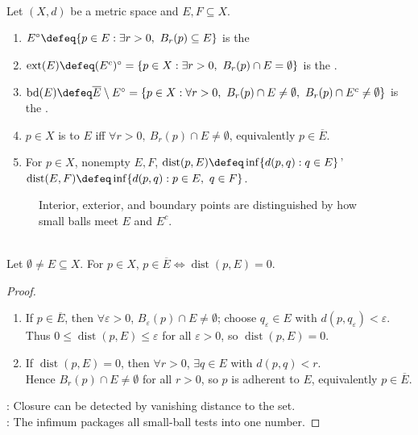\begin{definition} \label{def:interior-closure-boundary}\label{def:adherent-points-and-closure}\label{def:set-distance-in-metric-space} \\
Let $(X,d)$ be a metric space and $E,F\subseteq X$.
\begin{enumerate}[label=(\roman*)]
\setlength{\itemsep}{0pt}
\item $E^\circ\defeq\{p\in E:\exists r>0,\ B_r(p)\subseteq E\}$ is the 
\item $\operatorname{ext}(E)\defeq(E^c)^\circ=\{p\in X:\exists r>0,\ B_r(p)\cap E=\emptyset\}$ is the .
\item $\operatorname{bd}(E)\defeq\overline{E}\setminus E^\circ=\{p\in X:\forall r>0,\ B_r(p)\cap E\ne\emptyset,\ B_r(p)\cap E^c\ne\emptyset\}$ is the .
\item $p\in X$ is  to $E$ iff $\forall r>0,\ B_r(p)\cap E\ne\emptyset$, equivalently $p\in\overline{E}$.
\item For $p\in X$, nonempty $E,F$, $\operatorname{dist}(p,E)\defeq\inf\{d(p,q):q\in E\}$' $\operatorname{dist}(E,F)\defeq\inf\{d(p,q):p\in E,\ q\in F\}$.
\end{enumerate}
\end{definition}

\begin{figure}[H]
  \centering
  
  \caption{Interior, exterior, and boundary points are distinguished by how small balls meet $E$ and $E^c$.}
  \label{fig:metric-ball-closure-boundary}
\end{figure}

\begin{proposition} \label{prop:set-distance-closure-criterion} \\
Let $\emptyset\ne E\subseteq X$. For $p\in X$, $p\in\overline{E}\Longleftrightarrow \operatorname{dist}(p,E)=0$.
\begin{proof}
\begin{enumerate}[label=\roman*.]
\setlength{\itemsep}{0pt}
\item[$(\Rightarrow)$] If $p\in\overline{E}$, then $\forall\varepsilon>0$, $B_\varepsilon(p)\cap E\ne\emptyset$; choose $q_\varepsilon\in E$ with $d(p,q_\varepsilon)<\varepsilon$.\\
Thus $0\leq\operatorname{dist}(p,E)\leq\varepsilon$ for all $\varepsilon>0$, so $\operatorname{dist}(p,E)=0$.
\item[$(\Leftarrow)$] If $\operatorname{dist}(p,E)=0$, then $\forall r>0$, $\exists q\in E$ with $d(p,q)<r$.\\
Hence $B_r(p)\cap E\ne\emptyset$ for all $r>0$, so $p$ is adherent to $E$, equivalently $p\in\overline{E}$.
\end{enumerate}
: Closure can be detected by vanishing distance to the set.\\
: The infimum packages all small-ball tests into one number.
\end{proof}
\end{proposition}


